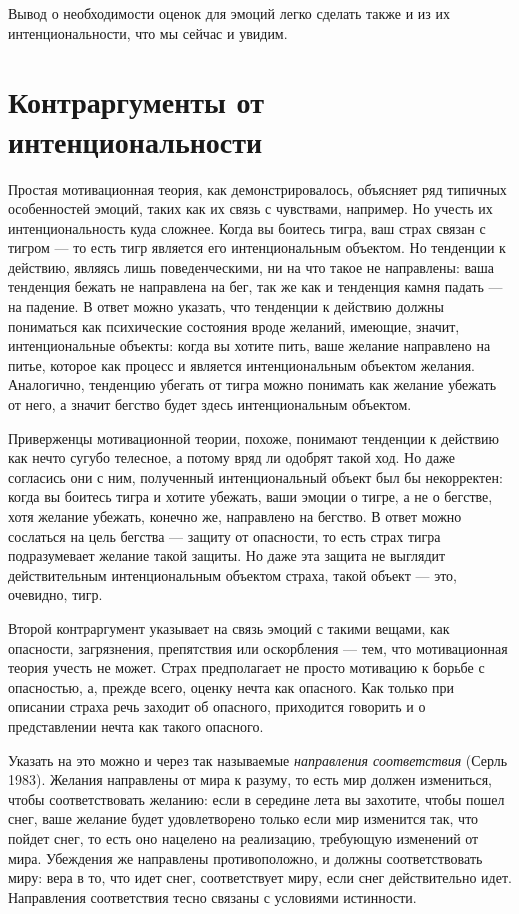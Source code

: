 \documentclass[11pt]{book}
\begin{document}
Вывод о необходимости оценок для эмоций легко сделать также и из их интенциональности, что мы сейчас и увидим.

\section{Контраргументы от интенциональности}

Простая мотивационная теория, как демонстрировалось, объясняет ряд типичных особенностей эмоций, таких как их связь с чувствами, например. Но учесть их интенциональность куда сложнее. Когда вы боитесь тигра, ваш страх связан с тигром --- то есть тигр является его интенциональным объектом. Но тенденции к действию, являясь лишь поведенческими, ни на что такое не направлены: ваша тенденция бежать не направлена на бег, так же как и тенденция камня падать --- на падение. В ответ можно указать, что тенденции к действию должны пониматься как психические состояния вроде желаний, имеющие, значит, интенциональные объекты: когда вы хотите пить, ваше желание направлено на питье, которое как процесс и является интенциональным объектом желания. Аналогично, тенденцию убегать от тигра можно понимать как желание убежать от него, а значит бегство будет здесь интенциональным объектом.

Приверженцы мотивационной теории, похоже, понимают тенденции к действию как нечто сугубо телесное, а потому вряд ли одобрят такой ход. Но даже согласись они с ним, полученный интенциональный объект был бы некорректен: когда вы боитесь тигра и хотите убежать, ваши эмоции о тигре, а не о бегстве, хотя желание убежать, конечно же, направлено на бегство. В ответ можно сослаться на цель бегства --- защиту от опасности, то есть страх тигра подразумевает желание такой защиты. Но даже эта защита не выглядит действительным интенциональным объектом страха, такой объект --- это, очевидно, тигр.

Второй контраргумент указывает на связь эмоций с такими вещами, как опасности, загрязнения, препятствия или оскорбления --- тем, что мотивационная теория учесть не может. Страх предполагает не просто мотивацию к борьбе с опасностью, а, прежде всего, оценку нечта как опасного. Как только при описании страха речь заходит об опасного, приходится говорить и о представлении нечта как такого опасного.

Указать на это можно и через так называемые \textit{направления соответствия} (Серль 1983). Желания направлены от мира к разуму, то есть мир должен измениться, чтобы соответствовать желанию: если в середине лета вы захотите, чтобы пошел снег, ваше желание будет удовлетворено только если мир изменится так, что пойдет снег, то есть оно нацелено на реализацию, требующую изменений от мира. Убеждения же направлены противоположно, и должны соответствовать миру: вера в то, что идет снег, соответствует миру, если снег действительно идет. Направления соответствия тесно связаны с условиями истинности.
\end{document}
